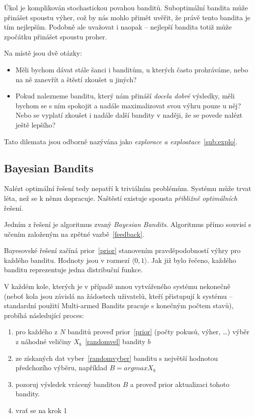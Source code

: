 \documentclass[thesis=M,czech]{FITthesis}[2014/05/07]
\begin{document}
Úkol je komplikován stochastickou povahou banditů. Suboptimální bandita může přinášet spoustu výher, což by nás mohlo přimět uvěřit, že právě tento bandita je tím nejlepším. Podobně ale uvažovat i naopak – nejlepší bandita totiž může zpočátku přinášet spoustu proher.

Na místě jsou dvě otázky:

\begin{itemize}
	\item Měli bychom dávat stále šanci i banditům, u kterých často prohráváme, nebo na ně zanevřít a štěstí zkoušet u jiných?
	\item Pokud nalezneme banditu, který nám přináší \emph{docela dobré} výsledky, měli bychom se s ním spokojit a nadále maximalizovat svou výhru pouze u něj? Nebo se vyplatí zkoušet i nadále další bandity v naději, že se povede nalézt ještě lepšího?
\end{itemize}

Tato dilemata jsou odborně nazývána jako \emph{explorace a exploatace}~\ref{sub:explo}.	

\subsection{Bayesian Bandits}
\label{bayes}
Nalézt optimální řešení tedy nepatří k triviálním problémům. Systému může trvat léta, než se k němu dopracuje. Naštěstí existuje spousta \emph{přibližně optimálních} řešení.

Jedním z řešení je algoritmus zvaný \emph{Bayesian Bandits}. Algoritmus přímo souvisí s učením založeným na zpětné vazbě~\ref{feedback}.

Bayesovské řešení začíná prior~\ref{prior} stanovením pravděpodobností výhry pro každého banditu. Hodnoty jsou v rozmezí $\langle0,1\rangle$. Jak již bylo řečeno, každého banditu reprezentuje jedna distribuční funkce.

V každém kole, kterých je v případě mnou vytvářeného systému nekonečně (neboť kola jsou závislá na žádostech uživatelů, kteří přistupují k systému – standardní použití Multi-armed Bandits pracuje s konečným počtem stavů), probíhá následující proces:

\begin{enumerate}
	\item pro každého z $N$ banditů proveď prior~\ref{prior} (počty pokusů, výher, \ldots) výběr z náhodné veličiny $X_b$~\ref{randomvel} bandity $b$
	\item ze získaných dat vyber~\ref{randomvyber} banditu s největší hodnotou předchozího výběru, například $B = argmax X_b$	
	\item pozoruj výsledek vrácený banditou $B$ a proveď prior aktualizaci tohoto bandity.
	\item vrať se na krok 1
\end{enumerate}
\end{document}
